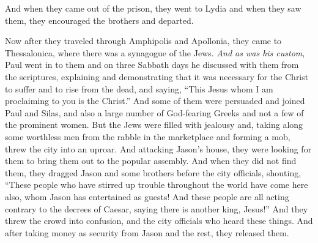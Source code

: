 \begin{biblechapter}
\verse And when they came out of the prison, they went to Lydia and when they saw them, they encouraged the brothers and departed.
\end{biblechapter}

\begin{biblechapter} %
 Now after they traveled through Amphipolis and Apollonia, they came to Thessalonica, where there was a synagogue of the Jews.
\verse \textit{And as was his custom}, Paul went in to them and on three Sabbath days he discussed with them from the scriptures,
\verse explaining and demonstrating that it was necessary for the Christ to suffer and to rise from the dead, and saying, “This Jesus whom I am proclaiming to you is the Christ.”
\verse And some of them were persuaded and joined Paul and Silas, and also a large number of God-fearing Greeks and not a few of the prominent women.
\verse But the Jews were filled with jealousy and, taking along some worthless men from the rabble in the marketplace and forming a mob, threw the city into an uproar. And attacking Jason’s house, they were looking for them to bring them out to the popular assembly.
\verse And when they did not find them, they dragged Jason and some brothers before the city officials, shouting, “These people who have stirred up trouble throughout the world have come here also,
\verse whom Jason has entertained as guests! And these people are all acting contrary to the decrees of Caesar, saying there is another king, Jesus!”
\verse And they threw the crowd into confusion, and the city officials who heard these things.
\verse And after taking money as security from Jason and the rest, they released them.

\end{biblechapter}
